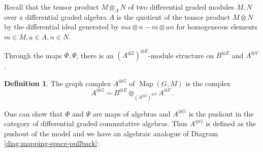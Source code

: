 \documentclass{scrartcl}
\theoremstyle{plain}
\theoremstyle{definition}
\newtheorem{definition}[theorem]{Definition}
\DeclareMathOperator{\Map}{Map}
\begin{document}
Recall that the tensor product $M\otimes_A N$ of two differential graded modules $M, N$ over a differential graded algebra $A$ is the quotient of the tensor product $M\otimes N$ by the differential ideal generated by $ma \otimes n - m\otimes an$ for homogeneous elements $m\in M, a\in A, n\in N$. 

Through the maps $\Phi, \Psi$, there is an $(A^{\otimes 2})^{\otimes E}$-module structure on $B^{\otimes E}$ and $A^{\otimes V}$. 
\begin{definition} The graph complex $A^{\otimes G}$ of $\Map(G, M)$ is the complex $$A^{\otimes G} = B^{\otimes E}\otimes_{(A^{\otimes 2})^{\otimes E}} A^{\otimes V}.$$\end{definition}
One can show that $\Phi$ and $\Psi$ are maps of algebras and $A^{\otimes G}$ is the pushout in the category of differential graded commutative algebras. Thus $A^{\otimes G}$ is defined as the pushout of the model and we have an algebraic analogue of Diagram \ref{diag:mapping-space-pullback}:

\begin{center}\label{diag:mapping-space-pullback-algebraic}
\end{center}
\end{document}
